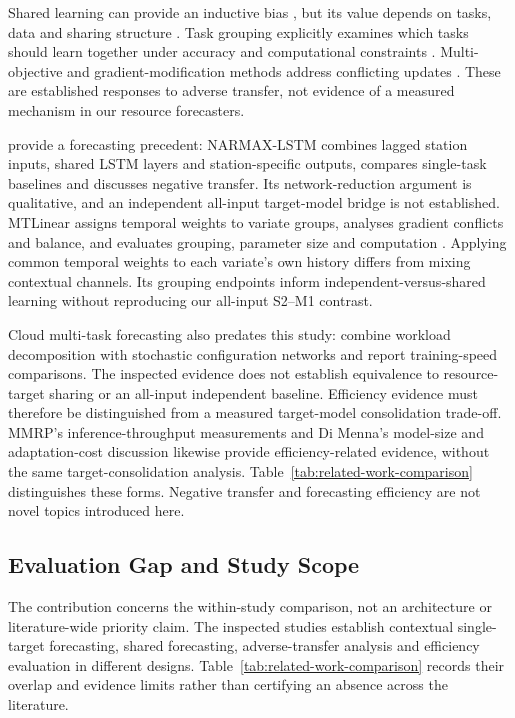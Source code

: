 \documentclass[a4paper,fleqn]{cas-dc}
\begin{document}
Shared learning can provide an inductive bias \citep{Caruana1997Multitask},
but its value depends on tasks, data and sharing structure
\citep{Yu2025MultitaskFundamentals}. Task grouping explicitly examines which
tasks should learn together under accuracy and computational constraints
\citep{Standley2020TaskGrouping,Fifty2021TaskGroupings}.
Multi-objective and gradient-modification methods address conflicting updates
\citep{Sener2018MultiObjective,Yu2020GradientSurgery}. These are established
responses to adverse transfer, not evidence of a measured mechanism in our
resource forecasters.

\citet{Nikentari2022NARMAXLSTM} provide a forecasting precedent:
NARMAX-LSTM combines lagged station inputs, shared LSTM layers and
station-specific outputs, compares single-task baselines and discusses
negative transfer. Its network-reduction argument is qualitative,
and an independent all-input target-model bridge is not established.
MTLinear assigns temporal weights to variate groups, analyses gradient
conflicts and balance, and evaluates grouping, parameter size and computation
\citep{Nochumsohn2025MTLinear}. Applying common temporal weights to each
variate's own history differs from mixing contextual channels. Its grouping
endpoints inform independent-versus-shared learning without reproducing our
all-input S2--M1 contrast.

Cloud multi-task forecasting also predates this study:
\citet{Bi2019CloudMultitask} combine workload decomposition with stochastic
configuration networks and report training-speed comparisons. The inspected
evidence does not establish equivalence to resource-target sharing or an
all-input independent baseline. Efficiency evidence must therefore be
distinguished from a measured target-model consolidation trade-off.
MMRP's inference-throughput measurements and Di Menna's model-size and
adaptation-cost discussion likewise provide efficiency-related evidence,
without the same target-consolidation analysis.
Table~\ref{tab:related-work-comparison} distinguishes these forms.
Negative transfer and forecasting efficiency are not novel topics introduced here.

\subsection{Evaluation Gap and Study Scope}
\label{sec:rw-gap}

The contribution concerns the within-study comparison, not an architecture
or literature-wide priority claim. The inspected studies establish contextual
single-target forecasting, shared forecasting, adverse-transfer analysis and
efficiency evaluation in different designs. Table~\ref{tab:related-work-comparison}
records their overlap and evidence limits rather than certifying an absence
across the literature.
\end{document}
